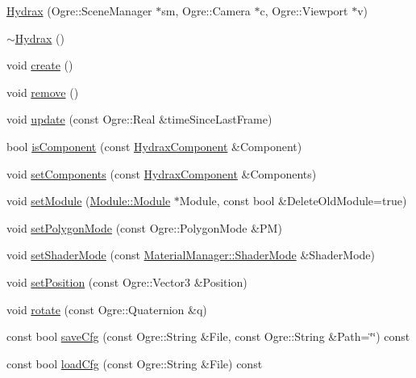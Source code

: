 \begin{CompactItemize}
\item 
\hyperlink{class_hydrax_1_1_hydrax_58642a636963c02a5aa689a66827cae8}{Hydrax} (Ogre::SceneManager $\ast$sm, Ogre::Camera $\ast$c, Ogre::Viewport $\ast$v)
\item 
\hyperlink{class_hydrax_1_1_hydrax_b340dd13dc9dfc678ef703abf4d37949}{$\sim$Hydrax} ()
\item 
void \hyperlink{class_hydrax_1_1_hydrax_af840e19208614533a6b344e32965ee2}{create} ()
\item 
void \hyperlink{class_hydrax_1_1_hydrax_02c9bf8f5576332fc836b4929e738529}{remove} ()
\item 
void \hyperlink{class_hydrax_1_1_hydrax_c584e30a6cbfb5d8884afb182c29d36a}{update} (const Ogre::Real \&timeSinceLastFrame)
\item 
bool \hyperlink{class_hydrax_1_1_hydrax_69e3ff9c4de804dec54156453837df95}{isComponent} (const \hyperlink{namespace_hydrax_e8e15abf83a51b0cf514c7d1a133650a}{HydraxComponent} \&Component)
\item 
void \hyperlink{class_hydrax_1_1_hydrax_6fbd6d0808443ba1d2d7569ac6b27583}{setComponents} (const \hyperlink{namespace_hydrax_e8e15abf83a51b0cf514c7d1a133650a}{HydraxComponent} \&Components)
\item 
void \hyperlink{class_hydrax_1_1_hydrax_3f678db49fe45320efb237d145ec63e4}{setModule} (\hyperlink{class_hydrax_1_1_module_1_1_module}{Module::Module} $\ast$Module, const bool \&DeleteOldModule=true)
\item 
void \hyperlink{class_hydrax_1_1_hydrax_9110c2569465617ca22f32fc67da096d}{setPolygonMode} (const Ogre::PolygonMode \&PM)
\item 
void \hyperlink{class_hydrax_1_1_hydrax_187619a5f2ea2e1fe65ac3cd35103203}{setShaderMode} (const \hyperlink{class_hydrax_1_1_material_manager_cb13fe494b6960a96270e1ac293c48fb}{MaterialManager::ShaderMode} \&ShaderMode)
\item 
void \hyperlink{class_hydrax_1_1_hydrax_26f48dec7e37c8f352570192ef38fb90}{setPosition} (const Ogre::Vector3 \&Position)
\item 
void \hyperlink{class_hydrax_1_1_hydrax_35958e296923f17c5eab19840d3711e2}{rotate} (const Ogre::Quaternion \&q)
\item 
const bool \hyperlink{class_hydrax_1_1_hydrax_3a812b0ad6d06bdfaa961a1e2caa7eee}{saveCfg} (const Ogre::String \&File, const Ogre::String \&Path=\char`\"{}\char`\"{}) const 
\item 
const bool \hyperlink{class_hydrax_1_1_hydrax_1a9a011581dc097e3928511632b534da}{loadCfg} (const Ogre::String \&File) const 

\end{CompactItemize}
